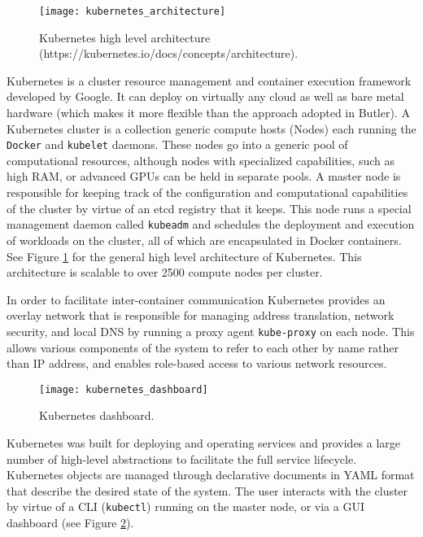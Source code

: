 \begin{figure}[H]
    \texttt{[image: kubernetes\_architecture]}
    \centering
    \caption {Kubernetes high level architecture (https://kubernetes.io/docs/concepts/architecture).}
    \label{fig:kubernetes_architecture}
\end{figure}

Kubernetes is a cluster resource management and container execution framework developed by Google. It can deploy on virtually any cloud as well as bare metal hardware (which makes it more flexible than the approach adopted in Butler). A Kubernetes cluster is a collection generic compute hosts (Nodes) each running the \texttt{Docker} and \texttt{kubelet} daemons. These nodes go into a generic pool of computational resources, although nodes with specialized capabilities, such as high RAM, or advanced GPUs can be held in separate pools. A master node is responsible for keeping track of the configuration and computational capabilities of the cluster by virtue of an etcd registry that it keeps. This node runs a special management daemon called \texttt{kubeadm} and schedules the deployment and execution of workloads on the cluster, all of which are encapsulated in Docker containers. See Figure \ref{fig:kubernetes_architecture} for the general high level architecture of Kubernetes. This architecture is scalable to over 2500 compute nodes per cluster\autocite{scalingkubernetes}.

In order to facilitate inter-container communication Kubernetes provides an overlay network that is responsible for managing address translation, network security, and local DNS by running a proxy agent \texttt{kube-proxy} on each node. This allows various components of the system to refer to each other by name rather than IP address, and enables role-based access to various network resources.

\begin{figure}[h!]
    \texttt{[image: kubernetes\_dashboard]}
    \centering
    \caption {Kubernetes dashboard.}
    \label{fig:kubernetes_dashboard}
\end{figure}

Kubernetes was built for deploying and operating services and provides a large number of high-level abstractions to facilitate the full service lifecycle. Kubernetes objects are managed through declarative documents in YAML format that describe the desired state of the system. The user interacts with the cluster by virtue of a CLI (\texttt{kubectl}) running on the master node, or via a GUI dashboard (see Figure \ref{fig:kubernetes_dashboard}).

